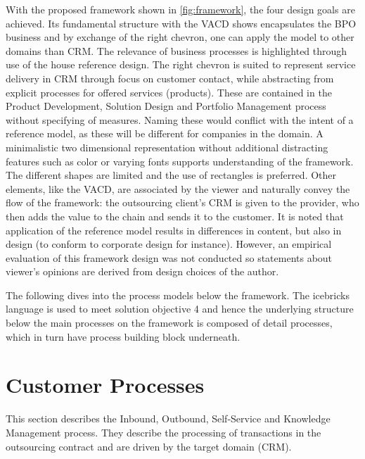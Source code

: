 	 
	 With the proposed framework shown in \Fig \ref{fig:framework}, the four design goals are achieved. Its fundamental structure with the \acrshort{VACD} shows encapsulates the BPO business and by exchange of the right chevron, one can apply the model to other domains than \acrshort{CRM}. The relevance of business processes is highlighted through use of the house reference design. The right chevron is suited to represent service delivery in \acrshort{CRM} through focus on customer contact, while abstracting from explicit processes for offered services (products). These are contained in the Product Development, Solution Design and Portfolio Management process without specifying of measures. Naming these would conflict with the intent of a reference model, as these will be different for companies in the domain. A minimalistic two dimensional representation without additional distracting features such as color or varying fonts supports understanding of the framework. The different shapes are limited and the use of rectangles is preferred. Other elements, like the \acrshort{VACD}, are associated by the viewer and naturally convey the flow of the framework: the outsourcing client's \acrshort{CRM} is given to the provider, who then adds the value to the chain and sends it to the customer. It is noted that application of the reference model results in differences in content, but also in design (to conform to corporate design for instance). However, an empirical evaluation of this framework design was not conducted so statements about viewer's opinions are derived from design choices of the author. 
	 
	 The following dives into the process models below the framework. The icebricks language is used to meet solution objective 4 and hence the underlying structure below the main processes on the framework is composed of detail processes, which in turn have process building block underneath. 
	 
	 
	 \section{Customer Processes}

	 
	 This section describes the Inbound, Outbound, Self-Service and Knowledge Management process. They describe the processing of transactions in the outsourcing contract and are driven by the target domain (\acrshort{CRM}). 
	 
